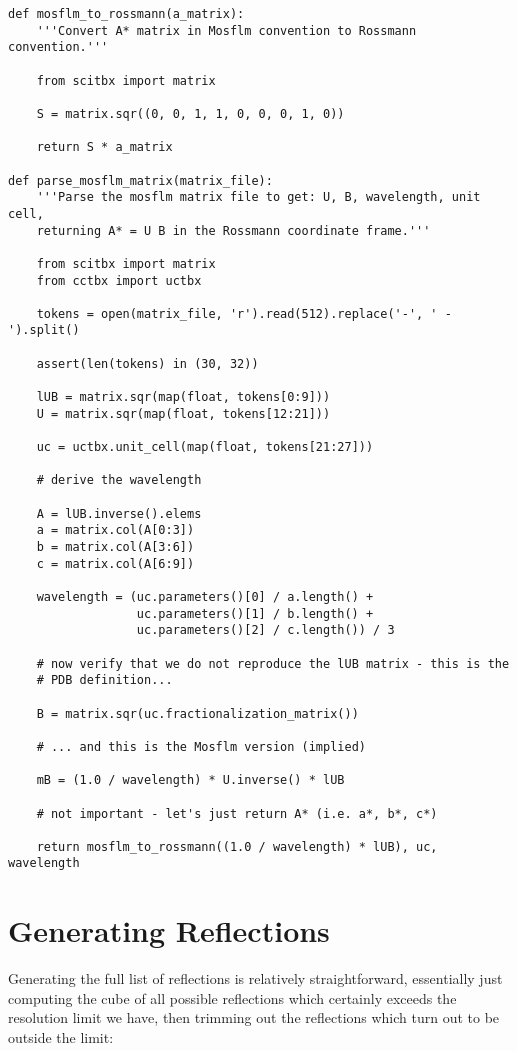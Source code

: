 \documentclass[a4paper, 11pt]{article}
\begin{document}
{\small
\begin{verbatim}
def mosflm_to_rossmann(a_matrix):
    '''Convert A* matrix in Mosflm convention to Rossmann convention.'''

    from scitbx import matrix
    
    S = matrix.sqr((0, 0, 1, 1, 0, 0, 0, 1, 0))

    return S * a_matrix

def parse_mosflm_matrix(matrix_file):
    '''Parse the mosflm matrix file to get: U, B, wavelength, unit cell,
    returning A* = U B in the Rossmann coordinate frame.'''

    from scitbx import matrix
    from cctbx import uctbx

    tokens = open(matrix_file, 'r').read(512).replace('-', ' -').split()

    assert(len(tokens) in (30, 32))

    lUB = matrix.sqr(map(float, tokens[0:9]))
    U = matrix.sqr(map(float, tokens[12:21]))
    
    uc = uctbx.unit_cell(map(float, tokens[21:27]))

    # derive the wavelength

    A = lUB.inverse().elems
    a = matrix.col(A[0:3])
    b = matrix.col(A[3:6])
    c = matrix.col(A[6:9])

    wavelength = (uc.parameters()[0] / a.length() +
                  uc.parameters()[1] / b.length() +
                  uc.parameters()[2] / c.length()) / 3

    # now verify that we do not reproduce the lUB matrix - this is the
    # PDB definition...

    B = matrix.sqr(uc.fractionalization_matrix())

    # ... and this is the Mosflm version (implied)

    mB = (1.0 / wavelength) * U.inverse() * lUB

    # not important - let's just return A* (i.e. a*, b*, c*)

    return mosflm_to_rossmann((1.0 / wavelength) * lUB), uc, wavelength
\end{verbatim}
}

\section{Generating Reflections}

Generating the full list of reflections is relatively straightforward, essentially just computing the cube of all possible reflections which certainly exceeds the resolution limit we have, then trimming out the reflections which turn out to be outside the limit:
\end{document}
